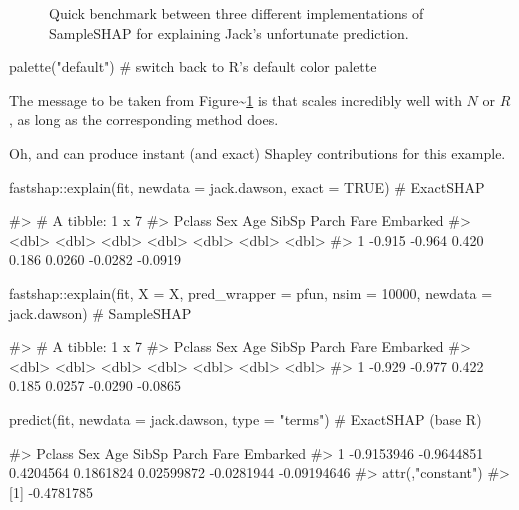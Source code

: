 \begin{Schunk}
\begin{figure}[!htb]
{}

\caption[Quick benchmark between three different implementations of SampleSHAP for explaining Jack's unfortunate prediction]{Quick benchmark between three different implementations of SampleSHAP for explaining Jack's unfortunate prediction.}\label{fig:titanic-benchmark}
\end{figure}
\begin{Sinput}
palette("default")  # switch back to R's default color palette
\end{Sinput}
\end{Schunk}

The message to be taken from
Figure\textasciitilde{}\ref{fig:titanic-benchmark} is that
 scales incredibly well with \(N\) or \(R\), as long as
the corresponding  method does.

Oh, and  can produce instant (and exact) Shapley
contributions for this example.

\begin{Schunk}
\begin{Sinput}
fastshap::explain(fit, newdata = jack.dawson, exact = TRUE)  # ExactSHAP
\end{Sinput}
\begin{Soutput}
#> # A tibble: 1 x 7
#>   Pclass    Sex   Age SibSp  Parch    Fare Embarked
#>    <dbl>  <dbl> <dbl> <dbl>  <dbl>   <dbl>    <dbl>
#> 1 -0.915 -0.964 0.420 0.186 0.0260 -0.0282  -0.0919
\end{Soutput}
\begin{Sinput}
fastshap::explain(fit, X = X, pred_wrapper = pfun, nsim = 10000,
                  newdata = jack.dawson)  # SampleSHAP
\end{Sinput}
\begin{Soutput}
#> # A tibble: 1 x 7
#>   Pclass    Sex   Age SibSp  Parch    Fare Embarked
#>    <dbl>  <dbl> <dbl> <dbl>  <dbl>   <dbl>    <dbl>
#> 1 -0.929 -0.977 0.422 0.185 0.0257 -0.0290  -0.0865
\end{Soutput}
\begin{Sinput}
predict(fit, newdata = jack.dawson, type = "terms")  # ExactSHAP (base R)
\end{Sinput}
\begin{Soutput}
#>       Pclass        Sex       Age     SibSp      Parch       Fare    Embarked
#> 1 -0.9153946 -0.9644851 0.4204564 0.1861824 0.02599872 -0.0281944 -0.09194646
#> attr(,"constant")
#> [1] -0.4781785
\end{Soutput}
\end{Schunk}

